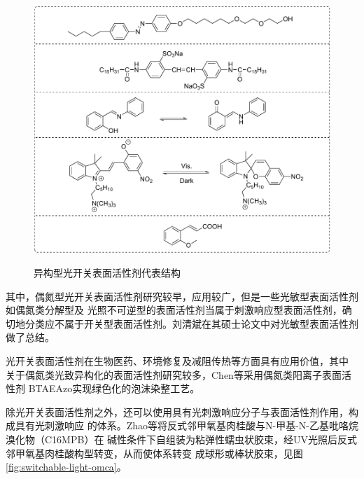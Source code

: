 \documentclass[bachelor,fandolfonts,replaceperiod]{jnuthesis}
\begin{document}
    \begin{figure}[htbp]
        \centering
        \includegraphics[scale=0.8]{Figure/switchable-light.pdf}\\
        \caption{异构型光开关表面活性剂代表结构\cite{张冤帝2017,karthaus1996,shang2003,吕湘亮2018}}\label{fig:switchable-light}
    \end{figure}
    
    其中，偶氮型光开关表面活性剂研究较早，应用较广，但是一些光敏型表面活性剂\cite{刘清斌2018}如偶氮类分解型及
    光照不可逆型的表面活性剂当属于刺激响应型表面活性剂，确切地分类应不属于开关型表面活性剂。刘清斌在其硕士论文中对光敏型表面活性剂做了总结。
    
    光开关表面活性剂在生物医药、环境修复及减阻传热等方面具有应用价值\cite{刘清斌2018}，其中
    关于偶氮类光致异构化的表面活性剂研究较多，Chen等\cite{chen2016}采用偶氮类阳离子表面活性剂
    BTAEAzo实现绿色化的泡沫染整工艺。
    
    除光开关表面活性剂之外，还可以使用具有光刺激响应分子与表面活性剂作用，构成具有光刺激响应
    的体系。Zhao等\cite{zhao2016}将反式邻甲氧基肉桂酸与N-甲基-N-乙基吡咯烷溴化物（C16MPB）在
    碱性条件下自组装为粘弹性蠕虫状胶束，经UV光照后反式邻甲氧基肉桂酸构型转变，从而使体系转变
    成球形或棒状胶束，见图\ref{fig:switchable-light-omca}。
    
\end{document}
